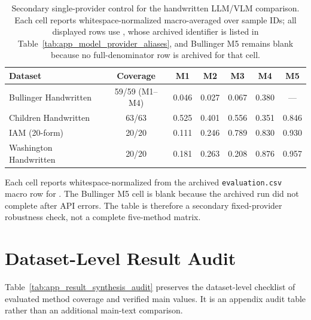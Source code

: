 \begin{table}[t]
  \centering
  \caption{Secondary single-provider \MistralLargeShort{} control for the handwritten LLM/VLM comparison. Each cell reports whitespace-normalized \LANormCombined{} macro-averaged over sample IDs; all displayed rows use \MistralLargeShort{}, whose archived identifier is listed in Table~\ref{tab:app_model_provider_aliases}, and Bullinger M5 remains blank because no full-denominator row is archived for that cell.}
  \label{tab:app_mistral_fixed_provider_matrix}
  \footnotesize
  \begin{tabular}{@{}l c c c c c c@{}}
    \toprule
    \textbf{Dataset} & \textbf{Coverage} & \textbf{M1} & \textbf{M2} & \textbf{M3} & \textbf{M4} & \textbf{M5} \\
    \midrule
    Bullinger Handwritten & 59/59 (M1--M4) & 0.046 & 0.027 & 0.067 & 0.380 & --- \\
    Children Handwritten & 63/63 & 0.525 & 0.401 & 0.556 & 0.351 & 0.846 \\
    IAM (20-form) & 20/20 & 0.111 & 0.246 & 0.789 & 0.830 & 0.930 \\
    Washington Handwritten & 20/20 & 0.181 & 0.263 & 0.208 & 0.876 & 0.957 \\
    \bottomrule
  \end{tabular}
  \vspace{0.35em}

  \parbox{0.82\linewidth}{\footnotesize Each cell reports whitespace-normalized \LANormCombined{} from the archived \texttt{evaluation.csv} macro row for \MistralLargeShort{}. The Bullinger M5 cell is blank because the archived run did not complete after API errors. The table is therefore a secondary fixed-provider robustness check, not a complete five-method matrix.}
\end{table}

\FloatBarrier

\section{Dataset-Level Result Audit}
\label{sec:appendix_dataset_result_audit}

Table~\ref{tab:app_result_synthesis_audit} preserves the dataset-level checklist of evaluated method coverage and verified main \LANormCombined{} values. It is an appendix audit table rather than an additional main-text comparison.

